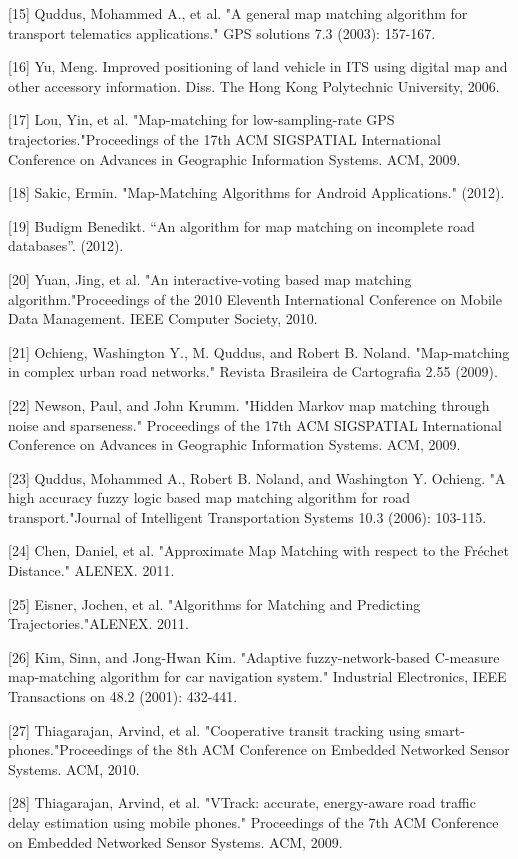 \documentclass[final,fmstyle]{fpunathesis}
\begin{document}
[15] Quddus, Mohammed A., et al. "A general map matching algorithm for transport telematics applications." GPS solutions 7.3 (2003): 157-167.

[16] Yu, Meng. Improved positioning of land vehicle in ITS using digital map and other accessory information. Diss. The Hong Kong Polytechnic University, 2006.

[17] Lou, Yin, et al. "Map-matching for low-sampling-rate GPS trajectories."Proceedings of the 17th ACM SIGSPATIAL International Conference on Advances in Geographic Information Systems. ACM, 2009.

[18] Sakic, Ermin. "Map-Matching Algorithms for Android Applications." (2012).

[19] Budigm Benedikt. “An algorithm for map matching on incomplete road databases”.  (2012).

[20] Yuan, Jing, et al. "An interactive-voting based map matching algorithm."Proceedings of the 2010 Eleventh International Conference on Mobile Data Management. IEEE Computer Society, 2010.

[21] Ochieng, Washington Y., M. Quddus, and Robert B. Noland. "Map-matching in complex urban road networks." Revista Brasileira de Cartografia 2.55 (2009).

[22] Newson, Paul, and John Krumm. "Hidden Markov map matching through noise and sparseness." Proceedings of the 17th ACM SIGSPATIAL International Conference on Advances in Geographic Information Systems. ACM, 2009.

[23] Quddus, Mohammed A., Robert B. Noland, and Washington Y. Ochieng. "A high accuracy fuzzy logic based map matching algorithm for road transport."Journal of Intelligent Transportation Systems 10.3 (2006): 103-115.

[24] Chen, Daniel, et al. "Approximate Map Matching with respect to the Fréchet Distance." ALENEX. 2011.

[25] Eisner, Jochen, et al. "Algorithms for Matching and Predicting Trajectories."ALENEX. 2011.

[26] Kim, Sinn, and Jong-Hwan Kim. "Adaptive fuzzy-network-based C-measure map-matching algorithm for car navigation system." Industrial Electronics, IEEE Transactions on 48.2 (2001): 432-441.

[27] Thiagarajan, Arvind, et al. "Cooperative transit tracking using smart-phones."Proceedings of the 8th ACM Conference on Embedded Networked Sensor Systems. ACM, 2010.

[28] Thiagarajan, Arvind, et al. "VTrack: accurate, energy-aware road traffic delay estimation using mobile phones." Proceedings of the 7th ACM Conference on Embedded Networked Sensor Systems. ACM, 2009.
\end{document}
